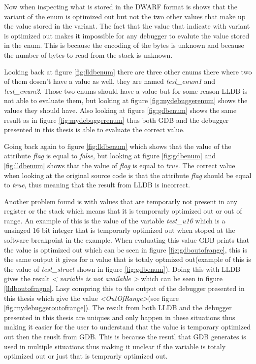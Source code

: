Now when inspecting what is stored in the \gls{DWARF} format is shows that the variant of the enum is optimized out but not the two other values that make up the value stored in the variant.
The fact that the value that indicate with variant is optimized out makes it impossible for any debugger to evalute the value stored in the enum.
This is because the encoding of the bytes is unknown and because the number of bytes to read from the stack is unknown.


Looking back at figure \ref{fig:lldbenum} there are three other enums there where two of them dosen't have a value as well, they are named \emph{test\_enum1} and \emph{test\_enum2}.
Those two enums should have a value but for some reason \gls{LLDB} is not able to evaluate them, but looking at figure \ref{fig:mydebuggerenum} shows the values they should have.
Also looking at figure \ref{fig:gdbenum} shows the same result as in figure \ref{fig:mydebuggerenum} thus both \gls{GDB} and the debugger presented in this thesis is able to evaluate the correct value.

Going back again to figure \ref{fig:lldbenum} which shows that the value of the attribute \emph{flag} is equal to \emph{false}, but looking at figure \ref{fig:gdbenum} and \ref{fig:lldbenum} shows that the value of \emph{flag} is equal to \emph{true}.
The correct value when looking at the original source code is that the attribute \emph{flag} should be equal to \emph{true}, thus meaning that the result from \gls{LLDB} is incorrect.


Another problem found is with values that are temporarly not present in any register or the stack which means that it is temporarly optimized out or out of range.
An example of this is the value of the variable \emph{test\_u16} which is a unsinged $16$ bit integer that is temporarly optimized out when stoped at the software breakpoint in the example.
When evaluating this value \gls{GDB} prints that the value is optimized out which can be seen in figure \ref{fig:gdboutofrange}, this is the same output it gives for a value that is totaly optmized out(example of this is the value of \emph{test\_struct} shown in figure \ref{fig:gdbenum}).
Doing this with \gls{LLDB} gives the result  \emph{< variable is not available >} which can be seen in figure \ref{lldboutofragne}.
Lasy compring this to the output of the debugger presented in this thesis which give the value \emph{<OutOfRange>}(see figure \ref{fig:mydebuggeroutofrange}).
The result from both \gls{LLDB} and the debugger presented in this thesis are uniques and only happen in these situations thus making it easier for the user to understand that the value is temporary optimized out then the reuslt from \gls{GDB}.
This is because the resutl that \gls{GDB} generates is used in multiple situations thus making it unclear if the variable is totaly optimized out or just that is temprarly optimized out.



